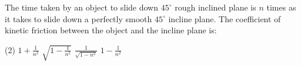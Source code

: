 \item The time taken by an object to slide down \(45^\circ\) rough inclined plane is \(n\) times as it takes to slide down a perfectly smooth \(45^\circ\) incline plane. The coefficient of kinetic friction between the object and the incline plane is:
    \begin{tasks}(2)
        \task \(1 + \frac{1}{n^2}\)
        \task \(\sqrt{1 - \frac{1}{n^2}}\)
        \task \(\frac{1}{\sqrt{1 - n^2}}\)
        \task \(1 - \frac{1}{n^2}\)
    \end{tasks}